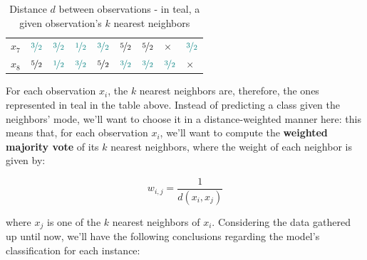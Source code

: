 \documentclass[12pt]{article}
\begin{document}
\begin{enumerate}[leftmargin=\labelsep]
\begin{table}[h]
\begin{tabular}{lllllllll}
            $x_7$ & $\textcolor{teal}{\nicefrac{3}{2}}$ & $\textcolor{teal}{\nicefrac{3}{2}}$ & $\textcolor{teal}{\nicefrac{1}{2}}$ & $\textcolor{teal}{\nicefrac{3}{2}}$ & $\nicefrac{5}{2}$                   & $\nicefrac{5}{2}$                   & $\times$                            & $\textcolor{teal}{\nicefrac{3}{2}}$ \\
            $x_8$ & $\nicefrac{5}{2}$                   & $\textcolor{teal}{\nicefrac{1}{2}}$ & $\textcolor{teal}{\nicefrac{3}{2}}$ & $\nicefrac{5}{2}$                   & $\textcolor{teal}{\nicefrac{3}{2}}$ & $\textcolor{teal}{\nicefrac{3}{2}}$ & $\textcolor{teal}{\nicefrac{3}{2}}$ & $\times$
          \end{tabular}
          \caption{Distance $d$ between observations - in teal, a given observation's $k$ nearest neighbors}
        \end{table}

        For each observation $x_i$, the $k$ nearest neighbors are, therefore, the ones represented in
        teal in the table above. Instead of predicting a class given the neighbors' mode,
        we'll want to choose it in a distance-weighted manner here: this means that, for each
        observation $x_i$, we'll want to compute the \textbf{weighted majority vote} of its $k$ nearest
        neighbors, where the weight of each neighbor is given by:

        $$w_{i, j} = \frac{1}{d(x_i, x_j)}$$

        where $x_j$ is one of the $k$ nearest neighbors of $x_i$. Considering the data gathered up until now,
        we'll have the following conclusions regarding the model's classification for each instance:


\end{enumerate}
\end{document}
